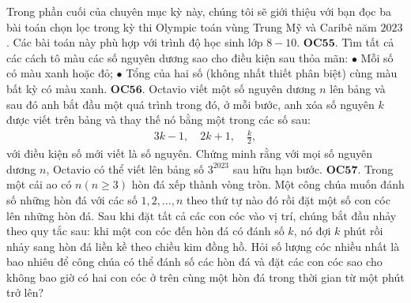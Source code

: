 \begin{multicols}{2}
	\vskip 0.1cm
	Trong phần cuối của chuyên mục kỳ này, chúng tôi sẽ giới thiệu với bạn đọc ba bài toán chọn lọc trong kỳ thi Olympic toán vùng Trung Mỹ và Caribê năm $2023$. Các bài toán này phù hợp với trình độ học sinh lớp $8-10$.
	\vskip 0.1cm
	{\bf\color{cackithi} OC$\pmb{55.}$} Tìm tất cả các cách tô màu các số nguyên dương sao cho điều kiện sau thỏa mãn:  
	\vskip 0.1cm
	$\bullet$ Mỗi số có màu xanh hoặc đỏ;
	\vskip 0.1cm
	$\bullet$ Tổng của hai số (không nhất thiết phân biệt) cùng màu bất kỳ  có màu xanh.
	\vskip 0.1cm
	{\bf\color{cackithi} OC$\pmb{56.}$} Octavio viết một số nguyên dương $n$ lên bảng  và sau đó anh bắt đầu một quá trình trong đó, ở mỗi bước, anh xóa số nguyên $k$ được viết trên bảng  và thay thế nó bằng một trong các số sau:
	\begin{align*}
		3k-1, \quad 2k+1, \quad \frac{k}{2},
	\end{align*}
	với điều kiện số mới viết là số nguyên.
	\vskip 0.1cm
	Chứng minh rằng với mọi số nguyên dương $n$, Octavio có thể viết lên bảng  số $3^{2023}$ sau hữu hạn bước.
	\vskip 0.1cm
	{\bf\color{cackithi} OC$\pmb{57.}$} Trong một cái ao có $n (n \geq 3)$  hòn đá  xếp thành vòng tròn. Một công chúa muốn đánh số những hòn đá với các số $1, 2, \dots, n$ theo thứ tự nào đó rồi đặt một số con cóc lên những hòn đá. Sau khi đặt tất cả các con cóc vào vị trí, chúng bắt đầu nhảy theo quy tắc sau: khi một con cóc đến hòn đá có đánh số $k$, nó đợi $k$ phút rồi nhảy sang hòn đá liền kề theo chiều kim đồng hồ.
	\vskip 0.1cm
	Hỏi số lượng cóc nhiều nhất là bao nhiêu để công chúa có thể đánh số các hòn đá và đặt các con cóc sao cho không bao giờ có hai con cóc ở trên cùng một hòn đá trong thời gian từ một phút trở lên?
\end{multicols}
